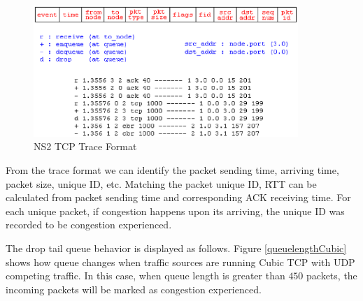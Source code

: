 \begin{figure}
\centering
\includegraphics[width=10cm]{format.eps}
\caption{NS2 TCP Trace Format}
\label{NS2Format}
\end{figure}
From the trace format we can identify the packet sending time, arriving time, packet size, unique ID, etc. Matching the packet unique ID, RTT can be calculated from packet sending time and corresponding ACK receiving time. For each unique packet, if congestion happens upon its arriving, the unique ID was recorded to be congestion experienced.

\par The drop tail queue behavior is displayed as follows.
Figure \ref{queuelengthCubic} shows how queue changes when traffic sources are running Cubic TCP with UDP competing traffic. 
In this case, when queue length is greater than $450$ packets, the incoming packets will be marked as congestion experienced.


